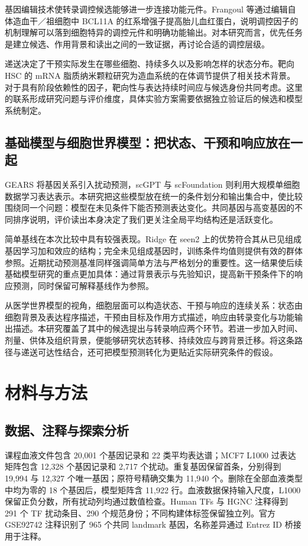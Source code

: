\documentclass[UTF8,a4paper,11pt,fontset=fandol]{ctexart}
\begin{document}
基因编辑技术使转录调控候选能够进一步连接功能元件。Frangoul 等通过编辑自体造血干／祖细胞中 BCL11A 的红系增强子提高胎儿血红蛋白\cite{R09}，说明调控因子的机制理解可以落到细胞特异的调控元件和明确功能输出。对本研究而言，优先任务是建立候选、作用背景和读出之间的一致证据，再讨论合适的调控层级。

递送决定了干预实际发生在哪些细胞、持续多久以及影响怎样的状态分布。靶向 HSC 的 mRNA 脂质纳米颗粒研究\cite{R10}为造血系统的在体调节提供了相关技术背景。对于具有阶段依赖性的因子，靶向性与表达持续时间应与候选身份共同考虑。这里的联系形成研究问题与评价维度，具体实验方案需要依据独立验证后的候选和模型系统制定。
\subsection{基础模型与细胞世界模型：把状态、干预和响应放在一起}
GEARS 将基因关系引入扰动预测\cite{R12}，scGPT 与 scFoundation 则利用大规模单细胞数据学习表达表示\cite{R13,R14}。本研究把这些模型放在统一的条件划分和输出集合中，使比较围绕同一个问题：模型在未见条件下能否预测表达变化。共同基因与高变基因的不同排序说明，评价读出本身决定了我们更关注全局平均结构还是活跃变化。

简单基线在本次比较中具有较强表现。Ridge 在 seen2 上的优势符合其从已见组成基因学习加和效应的结构；完全未见组成基因时，训练条件均值则提供有效的群体参照。近期扰动预测基准同样强调简单方法与严格划分的重要性\cite{R15,R16}。这一结果使后续基础模型研究的重点更加具体：通过背景表示与先验知识，提高新干预条件下的响应预测，同时保留可解释基线作为参照。

从医学世界模型的视角，细胞层面可以构造状态、干预与响应的连续关系：状态由细胞背景及表达程序描述，干预由目标及作用方式描述，响应由转录变化与功能输出描述。本研究覆盖了其中的候选提出与转录响应两个环节。若进一步加入时间、剂量、供体及组织背景，便能够研究状态转移、持续效应与跨背景迁移。将这条路径与递送可达性结合，还可把模型预测转化为更贴近实际研究条件的假设。

\clearpage
\section{材料与方法}
\subsection{数据、注释与探索分析}
课程血液文件包含 20,001 个基因记录和 22 类平均表达谱；MCF7 L1000 过表达矩阵包含 12,328 个基因记录和 2,717 个扰动。重复基因保留首条，分别得到 19,994 与 12,327 个唯一基因；原符号精确交集为 11,940 个。删除在全部血液类型中均为零的 18 个基因后，模型矩阵含 11,922 行。血液数据保持输入尺度，L1000 保留正负分数，所有扰动列均通过数值检查。Human TFs 与 HGNC 注释得到 291 个 TF 扰动条目、290 个规范身份\cite{R02}；不同构建体标签保留独立列。官方 GSE92742 注释识别了 965 个共同 landmark 基因，名称差异通过 Entrez ID 桥接用于注释。
\end{document}
